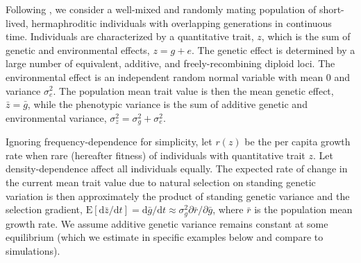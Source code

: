 \documentclass[12pt,letterpaper]{article} %
\begin{document}
Following \cite{Lynch1993}, we consider a well-mixed and randomly mating population of short-lived, hermaphroditic individuals with overlapping generations in continuous time.
Individuals are characterized by a quantitative trait, $z$, which is the sum of genetic and environmental effects, $z = g + e$.
The genetic effect is determined by a large number of equivalent, additive, and freely-recombining diploid loci.
The environmental effect is an independent random normal variable with mean 0 and variance $\sigma_e^2$.
The population mean trait value is then the mean genetic effect, $\bar{z} = \bar{g}$, while the phenotypic variance is the sum of additive genetic and environmental variance, $\sigma_z^2 = \sigma_g^2 + \sigma_e^2$.


Ignoring frequency-dependence for simplicity, let $r(z)$ be the per capita growth rate when rare (hereafter fitness) of individuals with quantitative trait $z$.
Let density-dependence affect all individuals equally.
The expected rate of change in the current mean trait value due to natural selection on standing genetic variation is then approximately the product of standing genetic variance and the selection gradient, $\mathrm{E}[\mathrm{d}\bar{z}/\mathrm{d}t] = \mathrm{d}\bar{g}/\mathrm{d}t \approx \sigma_g^2 \partial \bar{r} / \partial \bar{g}$, where $\bar{r}$ is the population mean growth rate.
We assume additive genetic variance remains constant at some equilibrium (which we estimate in specific examples below and compare to simulations).
\end{document}
